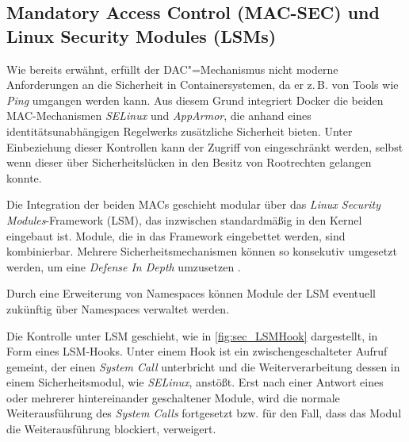 \documentclass[../main.tex]{subfiles}
\begin{document}



    \subsection{Mandatory Access Control (\acrshort{MAC-SEC}) und Linux Security Modules (\acrshort{LSM}s)}
		\label{lsm}
			Wie bereits erwähnt, erfüllt der DAC"=Mechanismus nicht moderne Anforderungen an die Sicherheit in Containersystemen, da er z.\,B. von Tools wie \emph{Ping} umgangen werden kann. Aus diesem Grund integriert Docker die beiden MAC-Mechanismen \emph{\acrshort{SELinux}} und \emph{\acrshort{AppArmor}}, die anhand eines identitätsunabhängigen Regelwerks zusätzliche Sicherheit bieten. Unter Einbeziehung dieser Kontrollen kann der Zugriff von \cbroken{} eingeschränkt werden, selbst wenn dieser über Sicherheitslücken in den Besitz von Rootrechten gelangen konnte.

			Die Integration der beiden MACs geschieht modular über das \emph{Linux Security Modules}-Framework (\acrshort{LSM}), das inzwischen standardmäßig in den Kernel eingebaut ist. Module, die in das Framework eingebettet werden, sind kombinierbar. Mehrere Sicherheitsmechanismen können so konsekutiv umgesetzt werden, um eine \emph{Defense In Depth} umzusetzen \cite[S.3]{LSMFramework}.

			Durch eine Erweiterung von Namespaces können Module der LSM eventuell zukünftig über Namespaces verwaltet werden.

			Die Kontrolle unter LSM geschieht, wie in \fig \ref{fig:sec_LSMHook} dargestellt, in Form eines LSM-Hooks. Unter einem Hook ist ein zwischengeschalteter Aufruf gemeint, der einen \emph{System Call} unterbricht und die Weiterverarbeitung dessen in einem Sicherheitsmodul, wie \emph{SELinux}, anstößt. Erst nach einer Antwort eines oder mehrerer hintereinander geschaltener Module, wird die normale Weiterausführung des \emph{System Calls} fortgesetzt bzw. für den Fall, dass das Modul die Weiterausführung blockiert, verweigert.
\end{document}
